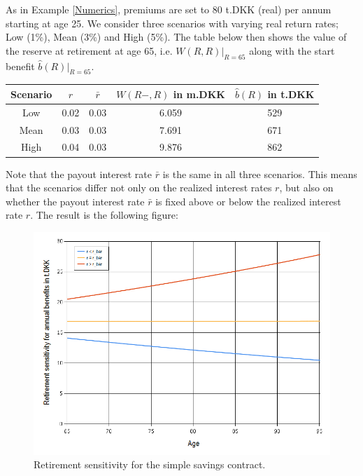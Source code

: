 \documentclass{article}
\newcommand{\1}[1]{\mathbbm{1}_{\left\lbrace #1 \right\rbrace}}
\theoremstyle{break}
\theoremstyle{remark}
\numberwithin{equation}{section}
\begin{document}
\begin{example}
As in Example \ref{Numerics}, premiums are set to 80 t.DKK (real) per annum starting at age 25. We consider three scenarios with varying real return rates; Low (1\%), Mean (3\%) and High (5\%). The table below then shows the value of the reserve at retirement at age 65, i.e. $W(R,R)|_{R=65}$ along with the start benefit $\hat{b}(R)|_{R=65}$.

\begin{center}
	\begin{tabular}{ |c|c|c|c|c| }
		\hline
		Scenario & $r$ & $\bar{r}$ & $W(R-,R)$ in m.DKK & $\hat{b}(R)$ in t.DKK \\
		\hline
		Low & 0.02 & 0.03 & 6.059 & 529 \\
		Mean & 0.03 & 0.03 & 7.691 & 671 \\
		High & 0.04 & 0.03 & 9.876 & 862 \\
		\hline
	\end{tabular}
\end{center}

Note that the payout interest rate $\bar{r}$ is the same in all three scenarios. This means that the scenarios differ not only on the realized interest rates $r$, but also on whether the payout interest rate $\bar{r}$ is fixed above or below the realized interest rate $r$. The result is the following figure:

\begin{figure}[H] \label{RSensiGraph}
	\centering
	\caption{Retirement sensitivity for the simple savings contract.}
	\includegraphics[width=\textwidth]{Rsensi}		
\end{figure}


\end{example}
\end{document}
